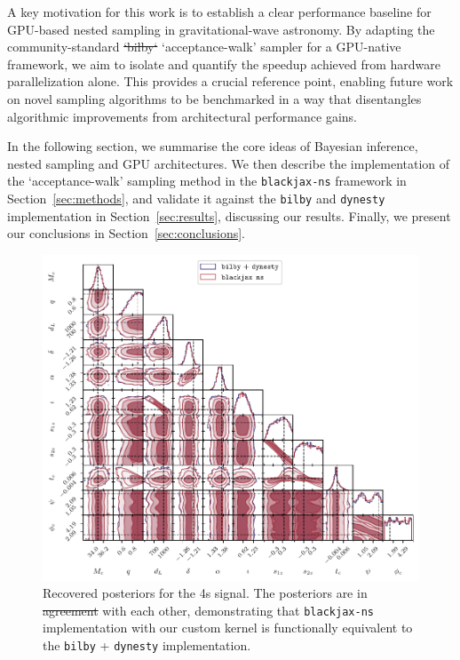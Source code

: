 \documentclass[fleqn,usenatbib]{mnras}
\providecommand{\DIFadd}[1]{{\protect\color{blue}\uwave{#1}}} %
\providecommand{\DIFdel}[1]{{\protect\color{red}\sout{#1}}}                      %
\providecommand{\DIFaddbegin}{} %
\providecommand{\DIFaddend}{} %
\providecommand{\DIFdelbegin}{} %
\providecommand{\DIFdelend}{} %
\providecommand{\DIFaddFL}[1]{\DIFadd{#1}} %
\providecommand{\DIFdelFL}[1]{\DIFdel{#1}} %
\providecommand{\DIFaddbeginFL}{} %
\providecommand{\DIFaddendFL}{} %
\providecommand{\DIFdelbeginFL}{} %
\providecommand{\DIFdelendFL}{} %
\newcommand{\DIFscaledelfig}{0.5}
\newlength{\DIFdelgraphicswidth} %
\newlength{\DIFdelgraphicsheight} %
\newcommand{\DIFaddincludegraphics}[2][]{{\color{blue}\fbox{\DIFOincludegraphics[#1]{#2}}}} %
\newcommand{\DIFdelincludegraphics}[2][]{%
\sbox{\DIFdelgraphicsbox}{\DIFOincludegraphics[#1]{#2}}%
\settoboxwidth{\DIFdelgraphicswidth}{\DIFdelgraphicsbox} %
\settoboxtotalheight{\DIFdelgraphicsheight}{\DIFdelgraphicsbox} %
\scalebox{\DIFscaledelfig}{%
\parbox[b]{\DIFdelgraphicswidth}{\usebox{\DIFdelgraphicsbox}\\[-\baselineskip] \rule{\DIFdelgraphicswidth}{0em}}\llap{\resizebox{\DIFdelgraphicswidth}{\DIFdelgraphicsheight}{%
\setlength{\unitlength}{\DIFdelgraphicswidth}%
\begin{picture}(1,1)%
\thicklines\linethickness{2pt} %
{\color[rgb]{1,0,0}\put(0,0){\framebox(1,1){}}}%
{\color[rgb]{1,0,0}\put(0,0){\line( 1,1){1}}}%
{\color[rgb]{1,0,0}\put(0,1){\line(1,-1){1}}}%
\end{picture}%
}\hspace*{3pt}}} %
} %
\DeclareRobustCommand{\DIFaddbegin}{\DIFOaddbegin \let\includegraphics\DIFaddincludegraphics} %
\DeclareRobustCommand{\DIFaddend}{\DIFOaddend \let\includegraphics\DIFOincludegraphics} %
\DeclareRobustCommand{\DIFdelbegin}{\DIFOdelbegin \let\includegraphics\DIFdelincludegraphics} %
\DeclareRobustCommand{\DIFdelend}{\DIFOaddend \let\includegraphics\DIFOincludegraphics} %
\DeclareRobustCommand{\DIFaddbeginFL}{\DIFOaddbeginFL \let\includegraphics\DIFaddincludegraphics} %
\DeclareRobustCommand{\DIFaddendFL}{\DIFOaddendFL \let\includegraphics\DIFOincludegraphics} %
\DeclareRobustCommand{\DIFdelbeginFL}{\DIFOdelbeginFL \let\includegraphics\DIFdelincludegraphics} %
\DeclareRobustCommand{\DIFdelendFL}{\DIFOaddendFL \let\includegraphics\DIFOincludegraphics} %
\begin{document}
A key motivation for this work is to establish a clear performance
baseline for GPU-based nested sampling in gravitational-wave astronomy.
By adapting the community-standard \DIFdelbegin \DIFdel{`bilby`
}\DIFdelend \DIFaddbegin \texttt{\DIFadd{bilby}}
\DIFaddend `acceptance-walk' sampler for a GPU-native framework, we aim to isolate
and quantify the speedup achieved from hardware parallelization alone.
This provides a crucial reference point, enabling future work on novel
sampling algorithms to be benchmarked in a way that disentangles
algorithmic improvements from architectural performance gains.

In the following section, we summarise the core ideas
of Bayesian inference, nested sampling and GPU architectures.
We then describe the implementation of the `acceptance-walk' sampling
method in the \texttt{blackjax-ns} framework in Section~\ref{sec:methods}, and validate it against
the \texttt{bilby} and \texttt{dynesty} implementation in Section~\ref{sec:results}, discussing
our results. Finally, we present our conclusions in Section~\ref{sec:conclusions}.

\begin{figure}
    \centering
    \includegraphics{figures/bilby_blackjax_comparison_4s.pdf}
    \caption{Recovered posteriors for the 4s signal. The posteriors are in \DIFdelbeginFL \DIFdelFL{agreement }\DIFdelendFL \DIFaddbeginFL \DIFaddFL{excellentagreement }\DIFaddendFL with each other, demonstrating that
    \texttt{blackjax-ns} implementation with our custom kernel is functionally equivalent to the \texttt{bilby} + \texttt{dynesty} implementation.}
    \label{fig:4s_posteriors}
\end{figure}
\end{document}
